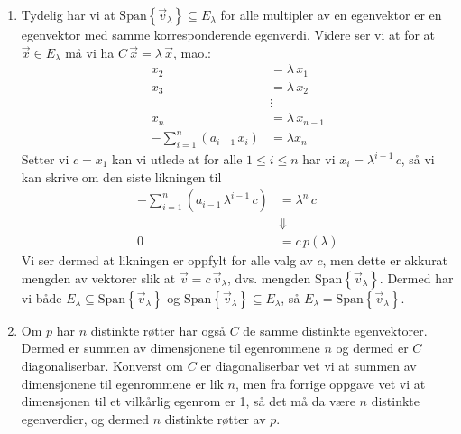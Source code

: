 \documentclass{article}[norsk]
\begin{document}
\begin{enumerate}[label=(\textit{\roman*})]
    \item Tydelig har vi at $\text{Span}\left\{\vec{v}_\lambda\right\}\subseteq E_\lambda$ for alle multipler av en egenvektor er en egenvektor med samme korresponderende egenverdi. 
    Videre ser vi at for at $\vec{x}\in E_\lambda$ må vi ha $C\,\vec{x}=\lambda\,\vec{x}$, mao.:
    \begin{equation*} \begin{aligned}
    	x_2&=\lambda\,x_1\\
        x_3&=\lambda\,x_2\\
        &\vdots\\
        x_n&=\lambda\,x_{n-1}\\
        -\sum_{i=1}^n \left(a_{i-1}\,x_i\right)&=\lambda x_n
    \end{aligned} \end{equation*}
    Setter vi $c=x_1$ kan vi utlede at for alle $1\leq i\leq n$ har vi $x_i=\lambda^{i-1}\,c$, så vi kan skrive om den siste likningen til
    \begin{equation*} \begin{aligned}
    	-\sum_{i=1}^n\left(a_{i-1}\,\lambda^{i-1}\,c\right)&=\lambda^{n}\,c\\
        &\Downarrow\\
        0&=c\,p(\lambda)
    \end{aligned} \end{equation*}
	Vi ser dermed at likningen er oppfylt for alle valg av $c$, men dette er akkurat mengden av vektorer slik at $\vec{v}=c\,\vec{v}_\lambda$, dvs. mengden $\text{Span}\left\{\vec{v}_\lambda\right\}$.  Dermed har vi både $E_\lambda \subseteq \text{Span}\left\{\vec{v}_\lambda\right\}$ og $\text{Span}\left\{\vec{v}_\lambda\right\}\subseteq E_\lambda$, så $E_\lambda=\text{Span}\left\{\vec{v}_\lambda\right\}$.
    
    \item Om $p$ har $n$ distinkte røtter har også $C$ de samme distinkte egenvektorer. Dermed er summen av dimensjonene til egenrommene $n$ og dermed er $C$ diagonaliserbar. Konverst om $C$ er diagonaliserbar vet vi at summen av dimensjonene til egenrommene er lik $n$, men fra forrige oppgave vet vi at dimensjonen til et vilkårlig egenrom er 1, så det må da være $n$ distinkte egenverdier, og dermed $n$ distinkte røtter av $p$. 
    

\end{enumerate}
\end{document}
